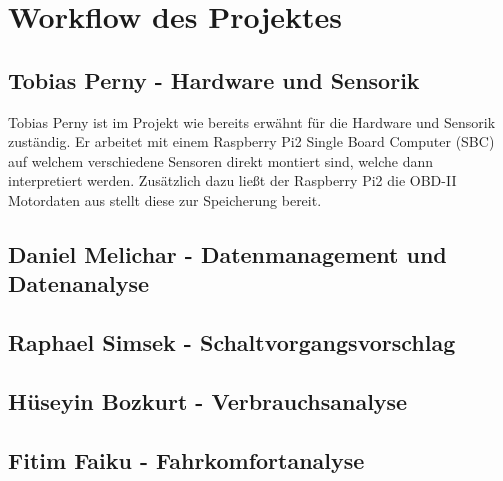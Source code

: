 \newline
\section{Workflow des Projektes}
	\subsection{Tobias Perny - Hardware und Sensorik}
	Tobias Perny ist im Projekt wie bereits erwähnt für die Hardware und Sensorik zuständig. Er arbeitet mit einem Raspberry Pi2 Single Board Computer (SBC) auf welchem verschiedene Sensoren direkt montiert sind, welche dann interpretiert werden. Zusätzlich dazu ließt der Raspberry Pi2 die OBD-II Motordaten aus stellt diese zur Speicherung bereit.

	\subsection{Daniel Melichar - Datenmanagement und Datenanalyse}

	\subsection{Raphael Simsek - Schaltvorgangsvorschlag}

	\subsection{Hüseyin Bozkurt - Verbrauchsanalyse}

	\subsection{Fitim Faiku - Fahrkomfortanalyse}


